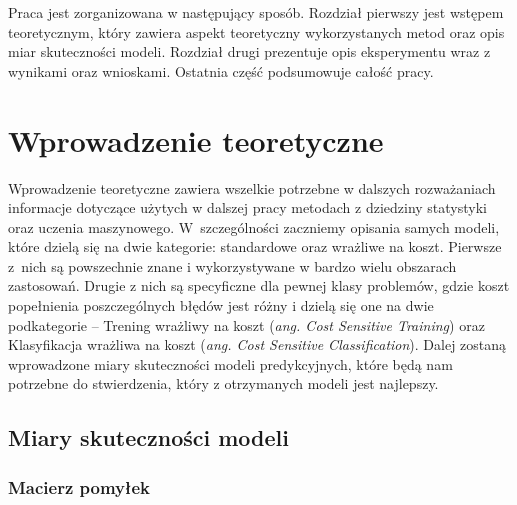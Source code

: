 \documentclass[inzynierska]{pwr_wmat_praca_dyplomowa}
\theoremstyle{plain}
\numberwithin{theorem}{chapter}
\theoremstyle{definition}
\numberwithin{theorem}{chapter}
\begin{document}
Praca jest zorganizowana w następujący sposób. Rozdział pierwszy jest wstępem teoretycznym, który zawiera aspekt teoretyczny wykorzystanych metod oraz opis miar skuteczności modeli. Rozdział drugi prezentuje opis eksperymentu wraz z wynikami oraz wnioskami. Ostatnia część podsumowuje całość pracy.

\chapter{Wprowadzenie teoretyczne}

Wprowadzenie teoretyczne zawiera wszelkie potrzebne w dalszych rozważaniach informacje dotyczące użytych w dalszej pracy metodach z dziedziny statystyki oraz uczenia maszynowego. W~szczególności zaczniemy opisania samych modeli, które dzielą się na dwie kategorie: standardowe oraz wrażliwe na koszt. Pierwsze z~nich są powszechnie znane i wykorzystywane w bardzo wielu obszarach zastosowań. Drugie z nich są specyficzne dla pewnej klasy problemów, gdzie koszt popełnienia poszczególnych błędów jest różny i dzielą się one na dwie podkategorie -- Trening wrażliwy na koszt (\textit{ang. Cost Sensitive Training}) oraz Klasyfikacja wrażliwa na koszt (\textit{ang. Cost Sensitive Classification}). Dalej zostaną wprowadzone miary skuteczności modeli predykcyjnych, które będą nam potrzebne do stwierdzenia, który z otrzymanych modeli jest najlepszy.


\section{Miary skuteczności modeli}

\subsection{Macierz pomyłek}
\end{document}
